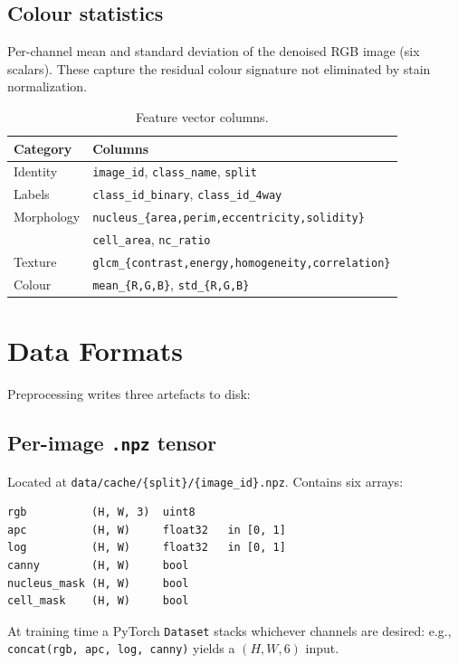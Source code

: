 \documentclass[conference,10pt]{IEEEtran}
\begin{document}
\subsection{Colour statistics}
Per-channel mean and standard deviation of the denoised RGB image (six scalars). These capture the residual colour signature not eliminated by stain normalization.

\begin{table}[t]
  \centering
  \caption{Feature vector columns.}
  \label{tab:features}
  \small
  \begin{tabular}{@{}ll@{}}
    \toprule
    Category & Columns \\
    \midrule
    Identity   & \texttt{image\_id}, \texttt{class\_name}, \texttt{split} \\
    Labels     & \texttt{class\_id\_binary}, \texttt{class\_id\_4way} \\
    Morphology & \texttt{nucleus\_\{area,perim,eccentricity,solidity\}} \\
               & \texttt{cell\_area}, \texttt{nc\_ratio} \\
    Texture    & \texttt{glcm\_\{contrast,energy,homogeneity,correlation\}} \\
    Colour     & \texttt{mean\_\{R,G,B\}}, \texttt{std\_\{R,G,B\}} \\
    \bottomrule
  \end{tabular}
\end{table}

\section{Data Formats}
\label{sec:formats}

Preprocessing writes three artefacts to disk:

\subsection{Per-image \texttt{.npz} tensor}
Located at \texttt{data/cache/\{split\}/\{image\_id\}.npz}. Contains six arrays:
\begin{lstlisting}
rgb          (H, W, 3)  uint8
apc          (H, W)     float32   in [0, 1]
log          (H, W)     float32   in [0, 1]
canny        (H, W)     bool
nucleus_mask (H, W)     bool
cell_mask    (H, W)     bool
\end{lstlisting}
At training time a PyTorch \texttt{Dataset} stacks whichever channels are desired: e.g., \texttt{concat(rgb, apc, log, canny)} yields a $(H, W, 6)$ input.
\end{document}
